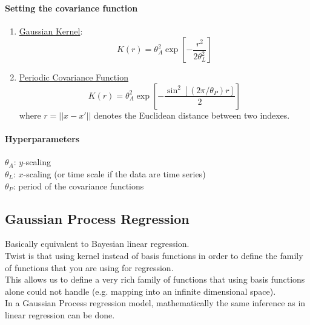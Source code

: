 \documentclass[11pt]{article}
\newcommand{\under}[1]{\underline{#1}}
\begin{document}
\paragraph{Setting the covariance function}
\begin{enumerate}
	\item \under{Gaussian Kernel}:
$$K(r) = \theta_A^2 \exp[-\frac{r^2}{2\theta_L^2}]$$
\item \under{Periodic Covariance Function}
$$K(r) = \theta_A^2\exp[-\frac{\sin^2[(2\pi/\theta_P)r]}{2}]$$
where $r = ||x-x'||$ denotes the Euclidean distance between two indexes.
\end{enumerate}
\paragraph{Hyperparameters}
$\theta_A$:  $y$-scaling \\
$\theta_L$:  $x$-scaling (or time scale if the data are time series) \\
$\theta_P$:  period of the covariance functions \\
\subsection{Gaussian Process Regression}
Basically equivalent to Bayesian linear regression.\\
Twist is that using kernel instead of basis functions in order to define the family of functions that you are using for regression.\\
This allows us to define a very rich family of functions that using basis functions alone could not handle (e.g. mapping into an infinite dimensional space).\\
In a Gaussian Process regression model, mathematically the same inference as in linear regression can be done.
\end{document}
